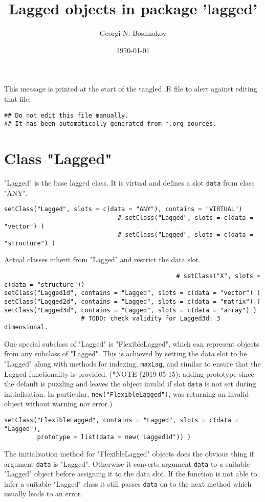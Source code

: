 \documentclass[11pt,a4paper]{article}
\author{Georgi N. Boshnakov}
\date{\today}
\title{Lagged objects in package 'lagged'}
\begin{document}
\maketitle
\tableofcontents

\vspace*{1cm}
This message is printed at the start of the tangled .R file to alert against editing that
file:
\begin{verbatim}
## Do not edit this file manually.
## It has been automatically generated from *.org sources.
\end{verbatim}



\section{Class "Lagged"}
\label{sec:orgc371a54}


"Lagged" is the base lagged class. It is virtual and defines a slot \texttt{data} from class
"ANY".
\begin{verbatim}
setClass("Lagged", slots = c(data = "ANY"), contains = "VIRTUAL")
                               # setClass("Lagged", slots = c(data = "vector") )
                               # setClass("Lagged", slots = c(data = "structure") )
\end{verbatim}

Actual classes inherit from "Lagged" and restrict the data slot.  
\begin{verbatim}
                                               # setClass("X", slots = c(data = "structure"))
setClass("Lagged1d", contains = "Lagged", slots = c(data = "vector") )
setClass("Lagged2d", contains = "Lagged", slots = c(data = "matrix") )
setClass("Lagged3d", contains = "Lagged", slots = c(data = "array") )
                     # TODO: check validity for Lagged3d: 3 dimensional.
\end{verbatim}
One special subclass of "Lagged" is "FlexibleLagged", which can represent objects from any
subclass of "Lagged". This is achieved by setting the data slot to be "Lagged" along with
methods for indexing, \texttt{maxLag}, and similar to ensure that the Lagged functionality is
provided. (*NOTE (2019-05-15): adding prototype since the default is puzzling and leaves the
object invalid if slot \texttt{data} is not set during initialisation. In particular,
\texttt{new("FlexibleLagged")}, was returning an invalid object without warning nor error.)
\begin{verbatim}
setClass("FlexibleLagged", contains = "Lagged", slots = c(data = "Lagged"),
         prototype = list(data = new("Lagged1d")) )
\end{verbatim}
The initialisation method for "FlexibleLagged" objects does the obvious thing if argument
\texttt{data} is "Lagged". Otherwise it converts argument \texttt{data} to a suitable "Lagged" object
before assigning it to the data slot. If the function is not able to infer a suitable
"Lagged" class it still passes \texttt{data} on to the next method which usually leads to an error.
\end{document}
